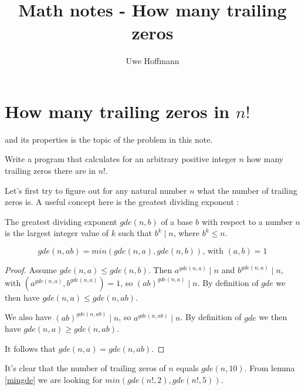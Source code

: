 

\title{Math notes - How many trailing zeros}
\author{Uwe Hoffmann}



\setcounter{chapter}{1}
\section*{How many trailing zeros in $n!$}

 and its properties is the topic of the problem in this note.

\vspace{10 mm}
\begin{problem}
Write a program that calculates for an arbitrary positive integer $n$ how many trailing zeros there are in $n!$.
\end{problem}

Let's first try to figure out for any natural number $n$ what the number of trailing zeros is. A useful concept here is the greatest dividing exponent \cite{mathworld01}:

\begin{defn}
The greatest dividing exponent  $gde(n, b)$ of a base  $b$ with respect to a number  $n$ is the largest integer value of  $k$ such that $b^k \mid n$, where $b^k \leq n$.
\end{defn}

\begin{lem}\label{mingde}
\begin{equation*}
gde(n, a b) = min(gde(n, a), gde(n, b))  \text{, with } (a, b) = 1
\end{equation*}
\end{lem}

\begin{proof}
Assume $gde(n,a) \leq gde(n, b)$. Then $a^{gde(n, a)} \mid n$ and $b^{gde(n, a)} \mid n$, with $(a^{gde(n, a)}, b^{gde(n, a)}) = 1$, so $(ab)^{gde(n, a)} \mid n$. By definition of $gde$ we then have $gde(n, a) \leq gde(n, ab)$. 

We also have $(ab)^{gde(n, ab)} \mid n$, so $a^{gde(n, ab)} \mid n$. By definition of $gde$ we then have $gde(n, a) \geq gde(n, ab)$. 

It follows that $gde(n, a)= gde(n, ab)$.
\end{proof}

It's clear that the number of trailing zeros of $n$ equals $gde(n, 10)$. From lemma \ref{mingde} we are looking for $min(gde(n!, 2), gde(n!, 5))$.\\


